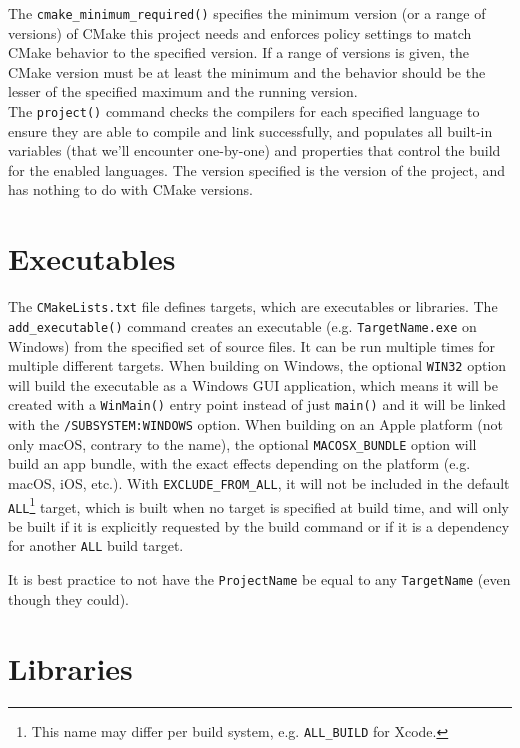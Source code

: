 \documentclass[table, xcdraw]{article}%
\begin{document}
The \texttt{cmake_minimum_required()} specifies the minimum version (or a range of versions) of CMake this project needs and enforces policy settings to match CMake behavior to the specified version. If a range of versions is given, the CMake version must be at least the minimum and the behavior should be the lesser of the specified maximum and the running version.\\
The \texttt{project()} command checks the compilers for each specified language to ensure they are able to compile and link successfully, and populates all built-in variables (that we'll encounter one-by-one) and properties that control the build for the enabled languages. The version specified is the version of the project, and has nothing to do with CMake versions.

\section{Executables}

The \texttt{CMakeLists.txt} file defines targets, which are executables or libraries. The \texttt{add_executable()} command creates an executable (e.g. \texttt{TargetName.exe} on Windows) from the specified set of source files. It can be run multiple times for multiple different targets. When building on Windows, the optional \texttt{WIN32} option will build the executable as a Windows GUI application, which means it will be created with a \texttt{WinMain()} entry point instead of just \texttt{main()} and it will be linked with the \texttt{/SUBSYSTEM:WINDOWS} option. When building on an Apple platform (not only macOS, contrary to the name), the optional \texttt{MACOSX_BUNDLE} option will build an app bundle, with the exact effects depending on the platform (e.g. macOS, iOS, etc.). With \texttt{EXCLUDE_FROM_ALL}, it will not be included in the default \texttt{ALL}\footnote{This name may differ per build system, e.g. \texttt{ALL_BUILD} for Xcode.} target, which is built when no target is specified at build time, and will only be built if it is explicitly requested by the build command or if it is a dependency for another \texttt{ALL} build target.

It is best practice to not have the \texttt{ProjectName} be equal to any \texttt{TargetName} (even though they could).

\section{Libraries}
\end{document}
